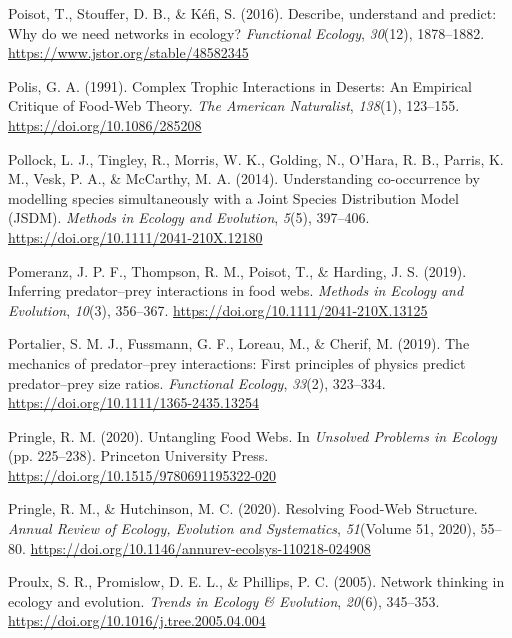 \documentclass[
]{article}
\newlength{\cslhangindent}
\newenvironment{CSLReferences}[2] %
 {\begin{list}{}{%
  \setlength{\itemindent}{0pt}
  \setlength{\leftmargin}{0pt}
  \setlength{\parsep}{0pt}
  \ifodd #1
   \setlength{\leftmargin}{\cslhangindent}
   \setlength{\itemindent}{-1\cslhangindent}
  \fi
  \setlength{\itemsep}{#2\baselineskip}}}
 {\end{list}}
\begin{document}
\begin{CSLReferences}{1}{0}
Poisot, T., Stouffer, D. B., \& Kéfi, S. (2016). Describe, understand
and predict: Why do we need networks in ecology? \emph{Functional
Ecology}, \emph{30}(12), 1878--1882.
\url{https://www.jstor.org/stable/48582345}

Polis, G. A. (1991). Complex {Trophic Interactions} in {Deserts}: {An
Empirical Critique} of {Food-Web Theory}. \emph{The American
Naturalist}, \emph{138}(1), 123--155.
\url{https://doi.org/10.1086/285208}

Pollock, L. J., Tingley, R., Morris, W. K., Golding, N., O'Hara, R. B.,
Parris, K. M., Vesk, P. A., \& McCarthy, M. A. (2014). Understanding
co-occurrence by modelling species simultaneously with a {Joint Species
Distribution Model} ({JSDM}). \emph{Methods in Ecology and Evolution},
\emph{5}(5), 397--406. \url{https://doi.org/10.1111/2041-210X.12180}

Pomeranz, J. P. F., Thompson, R. M., Poisot, T., \& Harding, J. S.
(2019). Inferring predator--prey interactions in food webs.
\emph{Methods in Ecology and Evolution}, \emph{10}(3), 356--367.
\url{https://doi.org/10.1111/2041-210X.13125}

Portalier, S. M. J., Fussmann, G. F., Loreau, M., \& Cherif, M. (2019).
The mechanics of predator--prey interactions: {First} principles of
physics predict predator--prey size ratios. \emph{Functional Ecology},
\emph{33}(2), 323--334. \url{https://doi.org/10.1111/1365-2435.13254}

Pringle, R. M. (2020). Untangling {Food Webs}. In \emph{Unsolved
{Problems} in {Ecology}} (pp. 225--238). Princeton University Press.
\url{https://doi.org/10.1515/9780691195322-020}

Pringle, R. M., \& Hutchinson, M. C. (2020). Resolving {Food-Web
Structure}. \emph{Annual Review of Ecology, Evolution and Systematics},
\emph{51}(Volume 51, 2020), 55--80.
\url{https://doi.org/10.1146/annurev-ecolsys-110218-024908}

Proulx, S. R., Promislow, D. E. L., \& Phillips, P. C. (2005). Network
thinking in ecology and evolution. \emph{Trends in Ecology \&
Evolution}, \emph{20}(6), 345--353.
\url{https://doi.org/10.1016/j.tree.2005.04.004}


\end{CSLReferences}
\end{document}
